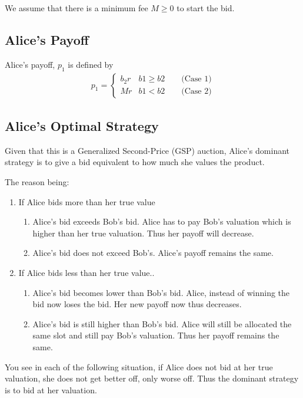 \documentclass[]{article}
\begin{document}
We assume that there is a minimum fee $M \geq 0$ to start the bid. 

\subsection{Alice's Payoff}

Alice's payoff, $p_1$ is defined by
\begin{align*}
	p_1 = 
	\begin{cases} 
		b_2r & b1 \geq b2 \qquad  \text{(Case 1)} \\
		Mr & b1 < b2 \qquad \text{(Case 2)}
	\end{cases}
\end{align*}

\subsection{Alice's Optimal Strategy}

Given that this is a Generalized Second-Price (GSP) auction, Alice's dominant strategy is to give a bid equivalent to how much she values the product.

The reason being:
\begin{enumerate}
	\item If Alice bids more than her true value
	\begin{enumerate}[label=\alph*]
		\item Alice's bid exceeds Bob's bid. Alice has to pay Bob's valuation which is higher than her true valuation. Thus her payoff will decrease.
		\item Alice's bid does not exceed Bob's. Alice's payoff remains the same. 
	\end{enumerate}
	\item If Alice bids less than her true value..
	\begin{enumerate}[label=\alph*]
		\item Alice's bid becomes lower than Bob's bid. Alice, instead of winning the bid now loses the bid. Her new payoff now thus decreases.
		\item Alice's bid is still higher than Bob's bid. Alice will still be allocated the same slot and still pay Bob's valuation. Thus her payoff remains the same.
	\end{enumerate}
\end{enumerate}

You see in each of the following situation, if Alice does not bid at her true valuation, she does not get better off, only worse off. Thus the dominant strategy is to bid at her valuation.
\end{document}
